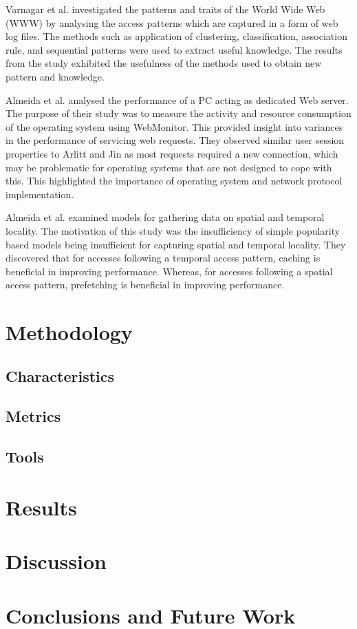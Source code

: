\documentclass[10pt,conference]{IEEEtran}
\begin{document}
Varnagar et al. \cite{Varnagar} investigated the patterns and traits of the World Wide Web (WWW) by analysing the access patterns which are captured in a form of web log files. The methods such as application of clustering, classification, association rule, and sequential patterns were used to extract useful knowledge. The results from the study exhibited the usefulness of the methods used to obtain new pattern and knowledge.

Almeida et al. \cite{almeida} analysed the performance of a PC acting as dedicated Web server. The purpose of their study was to measure the activity and resource consumption of the operating system using WebMonitor. This provided insight into variances in the performance of servicing web requests. They observed similar user session properties to Arlitt and Jin \cite{world_cup} as most requests required a new connection, which may be problematic for operating systems that are not designed to cope with this. This highlighted the importance of operating system and network protocol implementation.

Almeida et al. \cite{reference_locality} examined models for gathering data on spatial and temporal locality. The motivation of this study was the insufficiency of simple popularity based models being insufficient for capturing spatial and temporal locality. They discovered that for accesses following a temporal access pattern, caching is beneficial in improving performance. Whereas, for accesses following a spatial access pattern, prefetching is beneficial in improving performance.

\section{Methodology}\label{methodology}
\subsection{Characteristics}
\subsection{Metrics}
\subsection{Tools}

\section{Results}\label{results}

\section{Discussion}\label{discussion}

\section{Conclusions and Future Work}\label{conclusions}



\end{document}

